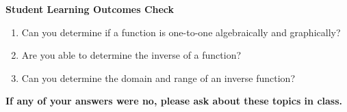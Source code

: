 \begin{enumerate}
\begin{enumerate}
\end{enumerate}




\end{enumerate}

\noindent \textbf{Student Learning Outcomes Check}

\begin{enumerate}
\item Can you determine if a function is one-to-one algebraically and graphically?
\item Are you able to determine the inverse of a function?
\item Can you determine the domain and range of an inverse function?

\end{enumerate}

\noindent \textbf{If any of your answers were no, please ask about these topics in class.}



